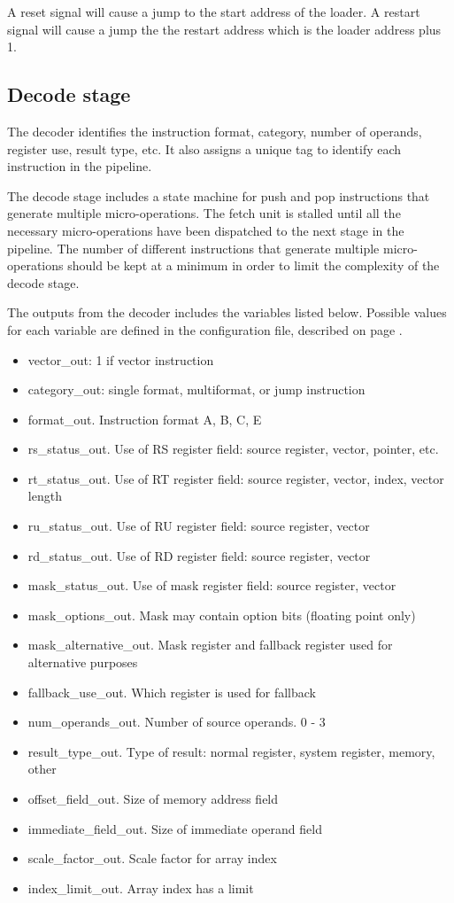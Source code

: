 \documentclass[11pt,a4paper,oneside,openright]{report}
\newcommand{\vv}{ \vspace{2mm} }   %
\begin{document}
A reset signal will cause a jump to the start address of the loader. A restart signal will cause a jump the the restart address which is the loader address plus 1.
\vv

\subsection{Decode stage}
The decoder identifies the instruction format, category, number of operands, register use, result type, etc. It also assigns a unique tag to identify each instruction in the pipeline.
\vv

The decode stage includes a state machine for push and pop instructions that generate multiple micro-operations. The fetch unit is stalled until all the necessary micro-operations have been dispatched to the next stage in the pipeline. The number of different instructions that generate multiple micro-operations should be kept at a minimum in order to limit the complexity of the decode stage.
\vv

The outputs from the decoder includes the variables listed below. Possible values for each variable are defined in the configuration file, described on page \pageref{SettingConfiguration}.
\vv

\begin{itemize}
\item vector\_out: 1 if vector instruction
\item category\_out: single format, multiformat, or jump instruction
\item format\_out. Instruction format A, B, C, E
\item rs\_status\_out. Use of RS register field: source register, vector, pointer, etc.
\item rt\_status\_out. Use of RT register field: source register, vector, index, vector length
\item ru\_status\_out. Use of RU register field: source register, vector
\item rd\_status\_out. Use of RD register field: source register, vector
\item mask\_status\_out. Use of mask register field: source register, vector
\item mask\_options\_out. Mask may contain option bits (floating point only)
\item mask\_alternative\_out. Mask register and fallback register used for alternative purposes
\item fallback\_use\_out. Which register is used for fallback
\item num\_operands\_out. Number of source operands. 0 - 3
\item result\_type\_out. Type of result: normal register, system register, memory, other
\item offset\_field\_out. Size of memory address field
\item immediate\_field\_out. Size of immediate operand field
\item scale\_factor\_out. Scale factor for array index
\item index\_limit\_out. Array index has a limit
\end{itemize}
\vv
\end{document}
